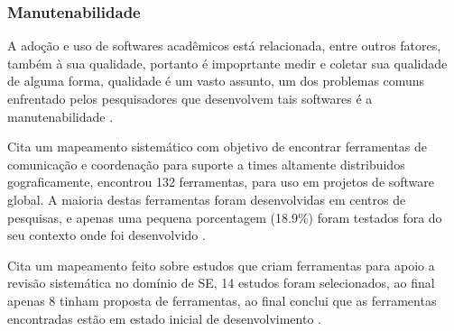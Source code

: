 \subsubsection{Manutenabilidade}


A adoção e uso de softwares acadêmicos está relacionada, entre outros fatores,
também à sua qualidade, portanto é impoprtante medir e coletar sua qualidade de
alguma forma, qualidade é um vasto assunto, um dos problemas comuns enfrentado
pelos pesquisadores que desenvolvem tais softwares é a manutenabilidade
\cite{Prlic2012}.

Cita um mapeamento sistemático com objetivo de encontrar ferramentas de
comunicação e coordenação para suporte a times altamente distribuidos
gograficamente, encontrou 132 ferramentas, para uso em projetos de software
global. A maioria destas ferramentas foram desenvolvidas em centros de
pesquisas, e apenas uma pequena porcentagem (18.9\%) foram testados fora do
seu contexto onde foi desenvolvido \cite{Portillo12}.

Cita um mapeamento feito sobre estudos que criam ferramentas para apoio a
revisão sistemática no domínio de SE, 14 estudos foram selecionados, ao final
apenas 8 tinham proposta de ferramentas, ao final conclui que as ferramentas
encontradas estão em estado inicial de desenvolvimento \cite{marshall2013tools}.



